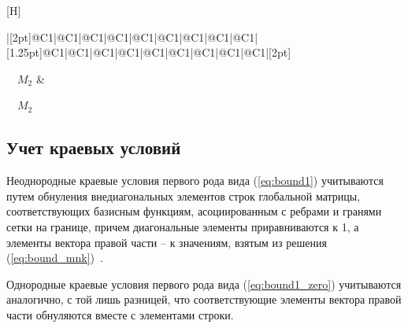 \documentclass[a4paper,14pt]{article}
\makeatletter
\renewenvironment{figure}[1][\fps@figure]{
  \edef\@tempa{\noexpand\@float{figure}[#1]}
  \@tempa
  \addtocounter{foofigure}{1}
}{
  \end@float
}
\makeatother
\begin{document}
\begin{figure}[H]
\begin{spacing}{0.75}
\begin{tabu}{|[2pt]@{}C{1}|@{}C{1}|@{}C{1}|@{}C{1}|@{}C{1}|@{}C{1}|@{}C{1}|@{}C{1}|@{}C{1}|[1.25pt]@{}C{1}|@{}C{1}|@{}C{1}|@{}C{1}|@{}C{1}|@{}C{1}|@{}C{1}|@{}C{1}|@{}C{1}|[2pt]}
			~\vspace{-1ex}\par~~\small $\scriptscriptstyle M_{2}$ &
			~\vspace{-1ex}\par~~\small $\scriptscriptstyle M_{2}$
		\\[0.25ex]\tabucline[2pt]{-}
	\end{tabu}
	\end{spacing}
	\vspace{1ex}
	\caption{структура СЛАУ}
	\label{fig:theory:matrx_structure}
\end{figure}


\subsection{Учет краевых условий}



Неоднородные краевые условия первого рода вида (\ref{eq:bound1}) учитываются путем обнуления внедиагональных элементов строк глобальной матрицы, соответствующих базисным функциям, асоциированным с ребрами и гранями сетки на границе, причем диагональные элементы приравниваются к 1, а элементы вектора правой части -- к значениям, взятым из решения (\ref{eq:bound_mnk})~\citep{balandin_slae}.

Однородные краевые условия первого рода вида (\ref{eq:bound1_zero}) учитываются аналогично, с той лишь разницей, что соответствующие элементы вектора правой части обнуляются вместе с элементами строки.
\end{document}
